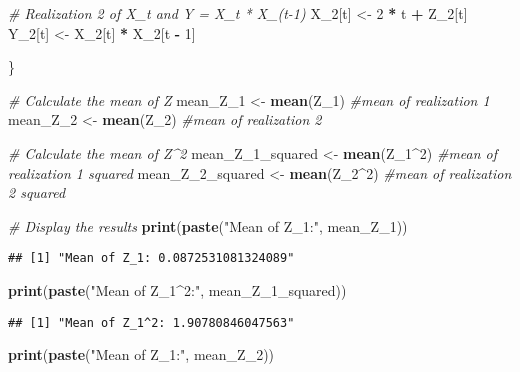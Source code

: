 \documentclass[
]{article}
\newenvironment{Shaded}{\begin{snugshade}}{\end{snugshade}}
\newcommand{\CommentTok}[1]{\textcolor[rgb]{0.56,0.35,0.01}{\textit{#1}}}
\newcommand{\DecValTok}[1]{\textcolor[rgb]{0.00,0.00,0.81}{#1}}
\newcommand{\FunctionTok}[1]{\textcolor[rgb]{0.13,0.29,0.53}{\textbf{#1}}}
\newcommand{\NormalTok}[1]{#1}
\newcommand{\OtherTok}[1]{\textcolor[rgb]{0.56,0.35,0.01}{#1}}
\newcommand{\SpecialCharTok}[1]{\textcolor[rgb]{0.81,0.36,0.00}{\textbf{#1}}}
\newcommand{\StringTok}[1]{\textcolor[rgb]{0.31,0.60,0.02}{#1}}
\begin{document}
\begin{Shaded}
\begin{Highlighting}[]
  \CommentTok{\# Realization 2 of X\_t and Y = X\_t * X\_(t{-}1)}
\NormalTok{  X\_2[t] }\OtherTok{\textless{}{-}} \DecValTok{2} \SpecialCharTok{*}\NormalTok{ t }\SpecialCharTok{+}\NormalTok{ Z\_2[t]}
\NormalTok{  Y\_2[t] }\OtherTok{\textless{}{-}}\NormalTok{ X\_2[t] }\SpecialCharTok{*}\NormalTok{ X\_2[t }\SpecialCharTok{{-}} \DecValTok{1}\NormalTok{]}
  
\NormalTok{\}}
  
\CommentTok{\# Calculate the mean of Z}
\NormalTok{mean\_Z\_1 }\OtherTok{\textless{}{-}} \FunctionTok{mean}\NormalTok{(Z\_1) }\CommentTok{\#mean of realization 1}
\NormalTok{mean\_Z\_2 }\OtherTok{\textless{}{-}} \FunctionTok{mean}\NormalTok{(Z\_2) }\CommentTok{\#mean of realization 2}

\CommentTok{\# Calculate the mean of Z\^{}2}
\NormalTok{mean\_Z\_1\_squared }\OtherTok{\textless{}{-}} \FunctionTok{mean}\NormalTok{(Z\_1}\SpecialCharTok{\^{}}\DecValTok{2}\NormalTok{) }\CommentTok{\#mean of realization 1 squared}
\NormalTok{mean\_Z\_2\_squared }\OtherTok{\textless{}{-}} \FunctionTok{mean}\NormalTok{(Z\_2}\SpecialCharTok{\^{}}\DecValTok{2}\NormalTok{) }\CommentTok{\#mean of realization 2 squared}

\CommentTok{\# Display the results}
\FunctionTok{print}\NormalTok{(}\FunctionTok{paste}\NormalTok{(}\StringTok{"Mean of Z\_1:"}\NormalTok{, mean\_Z\_1))}
\end{Highlighting}
\end{Shaded}

\begin{verbatim}
## [1] "Mean of Z_1: 0.0872531081324089"
\end{verbatim}

\begin{Shaded}
\begin{Highlighting}[]
\FunctionTok{print}\NormalTok{(}\FunctionTok{paste}\NormalTok{(}\StringTok{"Mean of Z\_1\^{}2:"}\NormalTok{, mean\_Z\_1\_squared))}
\end{Highlighting}
\end{Shaded}

\begin{verbatim}
## [1] "Mean of Z_1^2: 1.90780846047563"
\end{verbatim}

\begin{Shaded}
\begin{Highlighting}[]
\FunctionTok{print}\NormalTok{(}\FunctionTok{paste}\NormalTok{(}\StringTok{"Mean of Z\_1:"}\NormalTok{, mean\_Z\_2))}
\end{Highlighting}
\end{Shaded}
\end{document}
